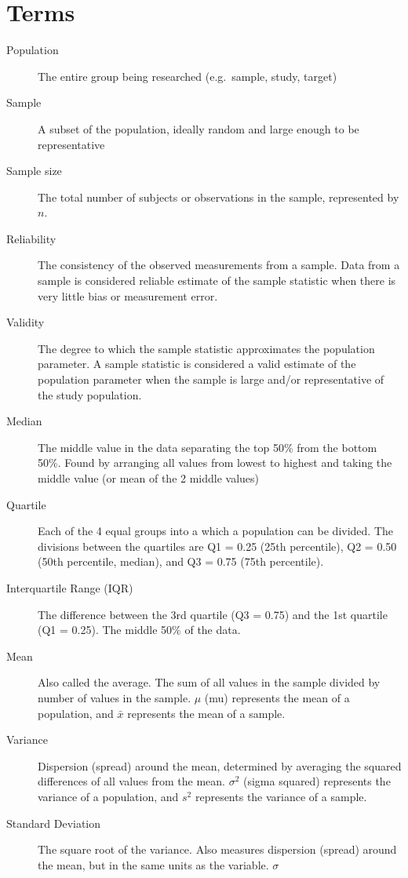 \documentclass[
  letterpaper,
  DIV=11,
  numbers=noendperiod]{scrartcl}
\begin{document}
\section{Terms}\label{terms}

\begin{description}
\item[Population]
The entire group being researched (e.g.~sample, study, target)
\item[Sample]
A subset of the population, ideally random and large enough to be
representative
\item[Sample size]
The total number of subjects or observations in the sample, represented
by \(n\).
\item[Reliability]
The consistency of the observed measurements from a sample. Data from a
sample is considered reliable estimate of the sample statistic when
there is very little bias or measurement error.
\item[Validity]
The degree to which the sample statistic approximates the population
parameter. A sample statistic is considered a valid estimate of the
population parameter when the sample is large and/or representative of
the study population.
\item[Median]
The middle value in the data separating the top 50\% from the bottom
50\%. Found by arranging all values from lowest to highest and taking
the middle value (or mean of the 2 middle values)
\item[Quartile]
Each of the 4 equal groups into a which a population can be divided. The
divisions between the quartiles are Q1 = 0.25 (25th percentile), Q2 =
0.50 (50th percentile, median), and Q3 = 0.75 (75th percentile).
\item[Interquartile Range (IQR)]
The difference between the 3rd quartile (Q3 = 0.75) and the 1st quartile
(Q1 = 0.25). The middle 50\% of the data.
\item[Mean]
Also called the average. The sum of all values in the sample divided by
number of values in the sample. \(\mu\) (mu) represents the mean of a
population, and \(\bar{x}\) represents the mean of a sample.
\item[Variance]
Dispersion (spread) around the mean, determined by averaging the squared
differences of all values from the mean. \(\sigma^2\) (sigma squared)
represents the variance of a population, and \(s^2\) represents the
variance of a sample.
\item[Standard Deviation]
The square root of the variance. Also measures dispersion (spread)
around the mean, but in the same units as the variable. \(\sigma\)

\end{description}
\end{document}
